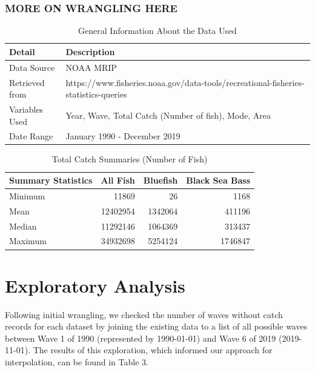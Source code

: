 \documentclass[
  12pt,
]{article}
\begin{document}
\hypertarget{more-on-wrangling-here}{%
\subsubsection{MORE ON WRANGLING HERE}\label{more-on-wrangling-here}}

\begin{table}[H]

\caption{\label{tab:table1}General Information About the Data Used}
\centering
\begin{tabular}[t]{l|l}
\hline
Detail & Description\\
\hline
Data Source & NOAA MRIP\\
\hline
Retrieved from & https://www.fisheries.noaa.gov/data-tools/recreational-fisheries-statistics-queries\\
\hline
Variables Used & Year, Wave, Total Catch (Number of fish), Mode, Area\\
\hline
Date Range & January 1990 - December 2019\\
\hline
\end{tabular}
\end{table}

\begin{table}[H]

\caption{\label{tab:table2}Total Catch Summaries (Number of Fish)}
\centering
\begin{tabular}[t]{l|r|r|r}
\hline
Summary Statistics & All Fish & Bluefish & Black Sea Bass\\
\hline
Minimum & 11869 & 26 & 1168\\
\hline
Mean & 12402954 & 1342064 & 411196\\
\hline
Median & 11292146 & 1064369 & 313437\\
\hline
Maximum & 34932698 & 5254124 & 1746847\\
\hline
\end{tabular}
\end{table}
\newpage

\hypertarget{exploratory-analysis}{%
\section{Exploratory Analysis}\label{exploratory-analysis}}

Following initial wrangling, we checked the number of waves without
catch records for each dataset by joining the existing data to a list of
all possible waves between Wave 1 of 1990 (represented by 1990-01-01)
and Wave 6 of 2019 (2019-11-01). The results of this exploration, which
informed our approach for interpolation, can be found in Table 3.
\end{document}
